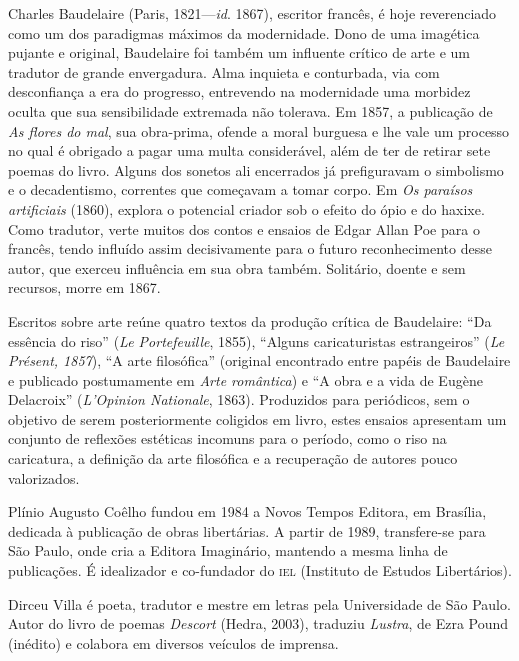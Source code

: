 \begin{resumopage}
\item[Charles Baudelaire] (Paris, 1821---\textit{id}. 1867), escritor francês, é
 hoje reverenciado como um dos paradigmas máximos da modernidade.
 Dono de uma imagética pujante e original, Baudelaire foi também um
 influente crítico de arte e um tradutor de grande envergadura. Alma
 inquieta e conturbada, via com desconfiança a era do progresso,
 entrevendo na modernidade uma morbidez oculta que sua sensibilidade
 extremada não tolerava. Em 1857, a publicação de \textit{As flores do mal}, sua
 obra-prima, ofende a moral burguesa e lhe vale um processo no qual é
 obrigado a pagar uma multa considerável, além de ter de retirar sete poemas do livro.
 Alguns dos sonetos ali encerrados já prefiguravam o simbolismo e o decadentismo, correntes que começavam a
 tomar corpo. Em \textit{Os paraísos artificiais} (1860), explora o potencial
 criador sob o efeito do ópio e do haxixe. Como tradutor, verte
 muitos dos contos e ensaios de  Edgar Allan Poe para o francês, tendo influído assim decisivamente
 para o futuro reconhecimento desse autor, que 
 exerceu influência em sua obra também. Solitário, doente e sem recursos,
 morre em 1867.
\item[Escritos sobre arte] reúne quatro textos da produção crítica de Baudelaire: 
``Da essência do riso'' (\textit{Le Portefeuille}, 1855), ``Alguns caricaturistas estrangeiros'' 
(\textit{Le Présent, 1857}), ``A arte filosófica'' (original encontrado entre papéis 
de Baudelaire e publicado postumamente em \textit{Arte romântica}) e 
``A obra e a vida de Eugène Delacroix'' (\textit{L'Opinion Nationale}, 1863).
Produzidos para periódicos, sem o objetivo de serem posteriormente coligidos em livro,
estes ensaios apresentam um conjunto de reflexões estéticas incomuns para o período, 
como o riso na caricatura, a definição da arte filosófica e a recuperação de autores pouco valorizados. 
\item[Plínio Augusto Coêlho] fundou em 1984 a Novos Tempos Editora, em
Brasília, dedicada à publicação de obras libertárias. A partir de
1989, transfere-se para São Paulo, onde cria a Editora Imaginário,
mantendo a mesma linha de publicações. É idealizador
e co-fundador do \textsc{iel} (Instituto de Estudos Libertários).
\item[Dirceu Villa] é poeta, tradutor e mestre em letras pela Universidade
de São Paulo. Autor do livro de poemas \textit{Descort} (Hedra, 2003), traduziu
\textit{Lustra}, de Ezra Pound (inédito) e colabora em diversos veículos de imprensa.

\end{resumopage}

